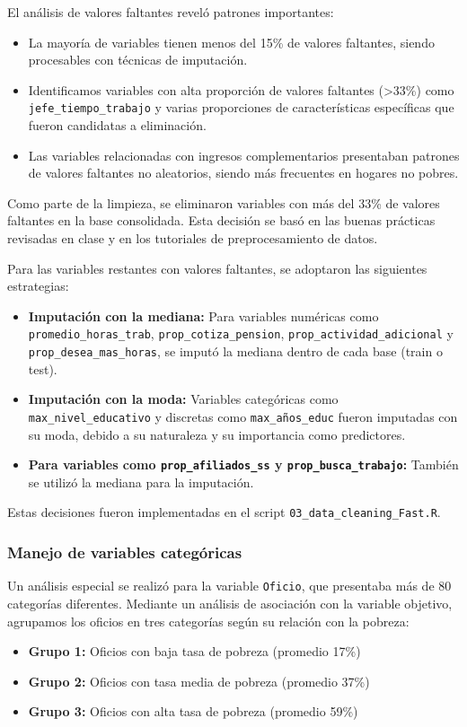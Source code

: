 \documentclass[12pt,a4paper,onecolumn]{article}
\begin{document}
El análisis de valores faltantes reveló patrones importantes:

\begin{itemize}
    \item La mayoría de variables tienen menos del 15\% de valores faltantes, siendo procesables con técnicas de imputación.
    \item Identificamos variables con alta proporción de valores faltantes (>33\%) como \texttt{jefe\_tiempo\_trabajo} y varias proporciones de características específicas que fueron candidatas a eliminación.
    \item Las variables relacionadas con ingresos complementarios presentaban patrones de valores faltantes no aleatorios, siendo más frecuentes en hogares no pobres.
\end{itemize}

Como parte de la limpieza, se eliminaron variables con más del 33\% de valores faltantes en la base consolidada. Esta decisión se basó en las buenas prácticas revisadas en clase y en los tutoriales de preprocesamiento de datos.

Para las variables restantes con valores faltantes, se adoptaron las siguientes estrategias:

\begin{itemize}
    \item \textbf{Imputación con la mediana:} Para variables numéricas como \texttt{promedio\_horas\_trab}, \texttt{prop\_cotiza\_pension}, \texttt{prop\_actividad\_adicional} y \texttt{prop\_desea\_mas\_horas}, se imputó la mediana dentro de cada base (train o test).
    \item \textbf{Imputación con la moda:} Variables categóricas como \texttt{max\_nivel\_educativo} y discretas como \texttt{max\_años\_educ} fueron imputadas con su moda, debido a su naturaleza y su importancia como predictores.
    \item \textbf{Para variables como \texttt{prop\_afiliados\_ss} y \texttt{prop\_busca\_trabajo}:} También se utilizó la mediana para la imputación.
\end{itemize}

Estas decisiones fueron implementadas en el script \texttt{03\_data\_cleaning\_Fast.R}.

\subsubsection{Manejo de variables categóricas}

Un análisis especial se realizó para la variable \texttt{Oficio}, que presentaba más de 80 categorías diferentes. Mediante un análisis de asociación con la variable objetivo, agrupamos los oficios en tres categorías según su relación con la pobreza:
\begin{itemize}
    \item \textbf{Grupo 1:} Oficios con baja tasa de pobreza (promedio 17\%)
    \item \textbf{Grupo 2:} Oficios con tasa media de pobreza (promedio 37\%)
    \item \textbf{Grupo 3:} Oficios con alta tasa de pobreza (promedio 59\%)
\end{itemize}
\end{document}
